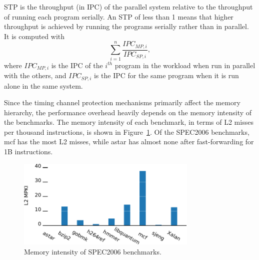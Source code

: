 STP is the throughput (in IPC) of the parallel system relative to the throughput 
of running each program serially. An STP of less than 1 means that higher 
throughput is achieved by running the programs serially rather than in 
parallel.
It is computed with
\begin{equation}
  \sum^n_{i=1} \frac{IPC_{MP,i}}{IPC_{SP,i}},
\end{equation}
where $IPC_{MP,i}$ is the IPC of the $i^{th}$ program in the workload when run 
in parallel with the others, and $IPC_{SP,i}$ is the IPC for the same program 
when it is run alone in the same system.


Since the timing channel protection mechanisms primarily affect the 
memory hierarchy, the performance overhead heavily depends on the memory intensity 
of the benchmarks.
The memory intensity of each benchmark, in terms of L2 misses per thousand 
instructions, is shown in
Figure~\ref{fig:memstudy}. Of the SPEC2006 benchmarks, mcf has the most L2 misses,
while astar has almost none after fast-forwarding for 1B instructions.

\begin{figure}
    \begin{center}
        \includegraphics[width=3.4in]{figs/MPKI.pdf}
        \caption{Memory intensity of SPEC2006 benchmarks.}
        \label{fig:memstudy}
    \end{center}
\end{figure}

